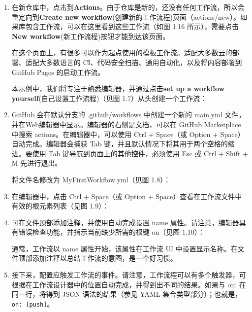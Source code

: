 \begin{enumerate}
\item 
在新仓库中，点击到\textbf{Actions}。由于仓库是新的，还没有任何工作流，所以会重定向到\textbf{Create new workflow}(创建新的工作流程)页面（actions/new）。如果库包含工作流，可以在这里看到这些工作流（如图 1.16 所示），需要点击\textbf{New workflow}(新工作流程)按钮才能到达该页面。

在这个页面上，有很多可以作为起点使用的模板工作流。适配大多数云的部署、适配大多数语言的 CI、代码安全扫描、通用自动化，以及将内容部署到 GitHub Pages 的启动工作流。

本示例中，我们将专注于熟悉编辑器，并通过点击\textbf{set up a workflow yourself}(自己设置工作流程)（见图 1.7）从头创建一个工作流：


\item 
GitHub 会在默认分支的 .github/workflows 中创建一个新的 main.yml 文件，并在Web编辑器中显示。编辑器的右侧是文档，可以在 GitHub Marketplace 中搜索 actions。在编辑器中，可以使用 Ctrl + Space（或 Option + Space）自动完成。编辑器会捕获 Tab 键，并且默认情况下将其用于两个空格的缩进。要使用 Tab 键导航到页面上的其他控件，必须使用 Esc 或 Ctrl + Shift + M 先进行退出。

将文件名修改为 MyFirstWorkflow.yml（见图 1.8）：


\item 
在编辑器中，点击 Ctrl + Space（或 Option + Space）查看在工作流文件中有效的根元素列表（见图 1.9）：


\item 
可在文件顶部添加注释，并使用自动完成设置 name 属性。请注意，编辑器具有错误检查功能，并指示当前缺少所需的根键 on（见图 1.10）：


通常，工作流以 name 属性开始，该属性在工作流 UI 中设置显示名称。在文件顶部添加注释以总结工作流的意图，是一个好习惯。

\item 
接下来，配置应触发工作流的事件。请注意，工作流程可以有多个触发器，可根据在工作流设计器中的位置自动完成，并得到出不同的结果。如果与 on: 在同一行，将得到 JSON 语法的结果（参见 YAML 集合类型部分）；也就是，\verb|on: [push]|。


\end{enumerate}
